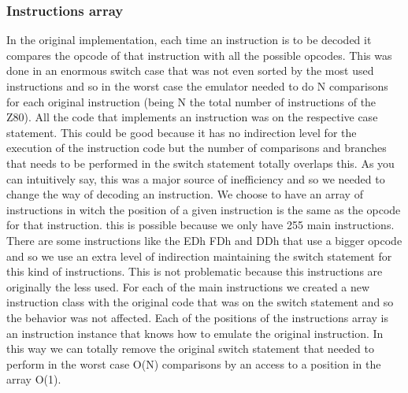 \subsubsection{Instructions array}
In the original implementation, each time an instruction is to be decoded it compares the opcode of that instruction with all the possible opcodes. This was done in an enormous switch case that was not even sorted by the most used instructions and so in the worst case the emulator needed to do N comparisons for each original instruction (being N the total number of instructions of the Z80). All the code that implements an instruction was on the respective case statement. This could be good because it has no indirection level for the execution of the instruction code but the number of comparisons and branches that needs to be performed in the switch statement totally overlaps this. 
As you can intuitively say, this was a major source of inefficiency and so we needed to change the way of decoding an instruction.
We choose to have an array of instructions in witch the position of a given instruction is the same as the opcode for that instruction. this is possible because we only have 255 main instructions. There are some instructions like the EDh FDh and DDh that use a bigger opcode and so we use an extra level of indirection maintaining the switch statement for this kind of instructions. This is not problematic because this instructions are originally the less used.
For each of the main instructions we created a new instruction class with the original code that was on the switch statement and so the behavior was not affected. Each of the positions of the instructions array is an instruction instance that knows how to emulate the original instruction.
In this way we can totally remove the original switch statement that needed to perform in the worst case O(N) comparisons by an access to a position in the array O(1).



